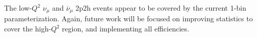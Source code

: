 \documentclass[12pt]{article}
\begin{document}
The low-$Q^2$ $\nu_{\mu}$ and $\overline{\nu}_{\mu}$ 2p2h events appear to be covered by the current 1-bin parameterization. Again, future work will be focused on improving statistics to cover the high-$Q^2$ region, and implementing all efficiencies.

\end{document}
